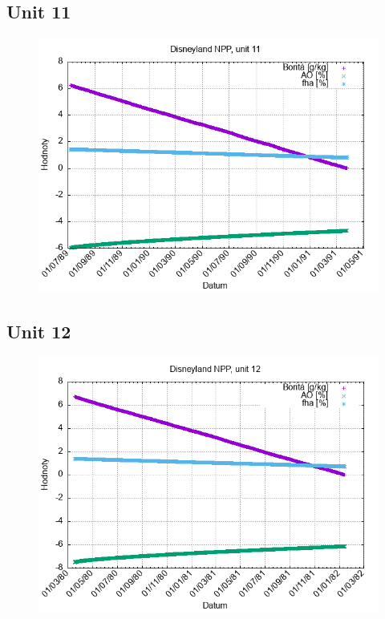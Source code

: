 \documentclass{article}
\begin{document}
\subsection*{Unit 11}
\begin{figure}[h!]
\centering
\includegraphics[width=14cm]{./grafy/Disneyland11.png}
\end{figure}
\clearpage
\subsection*{Unit 12}
\begin{figure}[h!]
\centering
\includegraphics[width=14cm]{./grafy/Disneyland12.png}
\end{figure}
\clearpage
\end{document}
